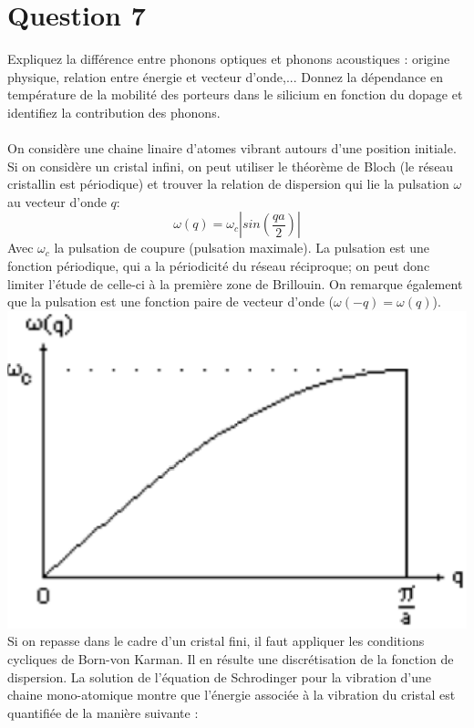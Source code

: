 \section{Question 7}
Expliquez la différence entre phonons optiques et phonons acoustiques : origine physique, relation entre énergie et vecteur d'onde,... Donnez la dépendance en température de la mobilité des porteurs dans le silicium en fonction du dopage et identifiez la contribution des phonons.
\\
\hbox{}
\\
On considère une chaine  linaire d'atomes vibrant autours d'une position initiale. Si on considère un cristal infini, on peut utiliser le théorème de Bloch (le réseau cristallin est périodique) et trouver la relation de dispersion qui lie la pulsation $\omega$ au vecteur d'onde $q$:
\begin{equation}
\omega(q) =\omega_c \left| sin\left(\frac{qa}{2} \right) \right|
\end{equation}
Avec $\omega_c$ la pulsation de coupure (pulsation maximale). La pulsation est une fonction périodique, qui a la périodicité du réseau réciproque; on peut donc limiter l'étude de celle-ci à la première zone de Brillouin. On remarque également que la pulsation est une fonction paire de vecteur d'onde ($\omega(-q)=\omega(q)$).
\\ \includegraphics[scale=0.4]{wdis.eps} \\
Si on repasse dans le cadre d'un cristal fini, il faut appliquer les conditions cycliques de Born-von Karman. Il en résulte une discrétisation de la fonction de dispersion. La solution de l'équation de Schrodinger pour la vibration d'une chaine mono-atomique montre que l'énergie associée à la vibration du cristal est quantifiée de la manière suivante :
